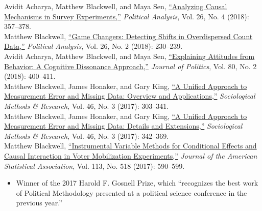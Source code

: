 \documentclass[margin,line,12pt]{res}
\begin{document}
\begin{resume}
 Avidit Acharya, Matthew Blackwell, and Maya Sen, \href{http://www.mattblackwell.org/files/papers/survey-experiments.pdf}{``Analyzing Causal Mechanisms in Survey Experiments,''} \emph{Political Analysis}, Vol. 26, No. 4 (2018): 357--378.\vspace{1em}\\
Matthew Blackwell, \href{http://www.mattblackwell.org/files/papers/gamechangers-letter.pdf}{``Game Changers: Detecting Shifts in Overdispersed Count Data,''} \emph{Political Analysis}, Vol. 26, No. 2 (2018): 230--239.\vspace{1em}\\
Avidit Acharya, Matthew Blackwell, and Maya Sen, \href{http://www.mattblackwell.org/files/papers/attitudes.pdf}{``Explaining Attitudes from Behavior: A Cognitive Dissonance Approach,''} \emph{Journal of Politics}, Vol. 80, No. 2 (2018): 400--411.\vspace{1em}\\
Matthew Blackwell, James Honaker, and Gary King, \href{http://gking.harvard.edu/files/measure.pdf}{``A Unified Approach to Measurement Error and
Missing Data: Overview and Applications,''} \emph{Sociological Methods \& Research}, Vol. 46, No. 3 (2017): 303--341.\vspace{1em}\\
Matthew Blackwell, James Honaker, and Gary King, \href{http://gking.harvard.edu/files/measured.pdf}{``A Unified Approach to Measurement Error and
  Missing Data: Details and Extensions,''} \emph{Sociological Methods \& Research}, Vol. 46, No. 3 (2017): 342--369.\vspace{1em}\\
Matthew Blackwell, \href{http://www.mattblackwell.org/files/papers/joint-iv.pdf}{``Instrumental Variable Methods for Conditional Effects and Causal Interaction in Voter Mobilization Experiments,''} \emph{Journal of the American Statistical Association}, Vol. 113, No. 518 (2017): 590--599. 
\begin{itemize} 
\item Winner of the 2017 Harold F. Gosnell Prize, which ``recognizes the best work of Political Methodology presented at a political science conference in the previous year.''
\end{itemize}


\end{resume}
\end{document}
